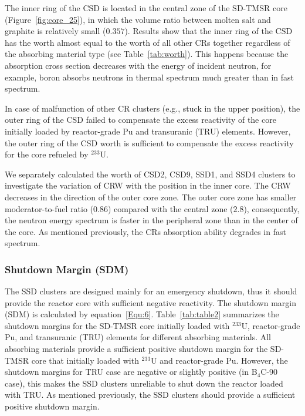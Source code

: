 The inner ring of the CSD is located in the central zone of the SD-TMSR core 
(Figure~\ref{fig:core_25}), in which the volume ratio between molten salt and 
graphite is relatively small ($0.357$). Results show that the inner ring of the CSD has 
the worth almost equal to the worth of all other CRs together regardless of 
the absorbing material type (see Table~\ref{tab:worth}). This happens because the absorption cross section
decreases with the energy of incident neutron, for example, boron absorbs neutrons in thermal spectrum much 
greater than in fast spectrum.

In case of malfunction of other CR clusters (e.g., stuck in the upper 
position), the outer ring of the CSD failed to compensate the excess 
reactivity of the core initially loaded by reactor-grade Pu and transuranic 
(TRU) elements. However, the outer ring of the CSD worth is sufficient 
to compensate the excess reactivity for the core refueled by $^{233}$U. 

We separately calculated the worth of CSD2, CSD9, SSD1, and SSD4 clusters to 
investigate the variation of CRW with the position in the inner core.
The CRW decreases in the direction of the outer core zone. The outer core zone 
has smaller moderator-to-fuel ratio ($0.86$) compared with the central zone 
($2.8$), consequently, the neutron energy spectrum is faster in the peripheral 
zone than in the center of the core. As mentioned previously, the CRs 
absorption ability degrades in fast spectrum.

\subsubsection{Shutdown Margin (SDM)}

The SSD clusters are designed mainly for an emergency shutdown, thus it should 
provide the reactor core with sufficient negative reactivity. The 
shutdown margin (SDM) is calculated by equation~\ref{Equ:6}.
Table~\ref{tab:table2} summarizes the shutdown margins for the SD-TMSR core 
initially loaded with $^{233}$U, reactor-grade Pu, and transuranic (TRU) 
elements for different absorbing materials. All absorbing materials provide a sufficient positive
shutdown margin for the SD-TMSR core that initially loaded with 
$^{233}$U and reactor-grade Pu. However, the shutdown margins for TRU case are 
negative or slightly positive (in B$_4$C-90 case), this makes the SSD clusters 
unreliable to shut down the reactor loaded with TRU.
As mentioned previously, the SSD clusters should 
provide a sufficient positive shutdown margin.

